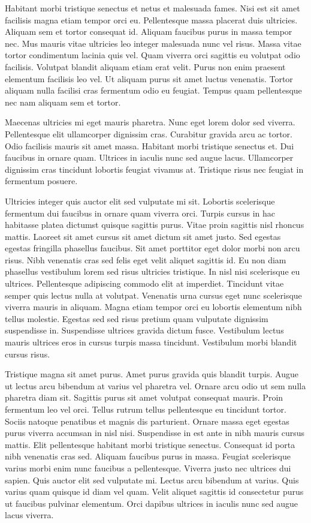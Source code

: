 \documentclass[11pt,a4paper]{article}
\begin{document}
Habitant morbi tristique senectus et netus et malesuada fames. Nisi est sit amet facilisis magna etiam tempor orci eu. Pellentesque massa placerat duis ultricies. Aliquam sem et tortor consequat id. Aliquam faucibus purus in massa tempor nec. Mus mauris vitae ultricies leo integer malesuada nunc vel risus. Massa vitae tortor condimentum lacinia quis vel. Quam viverra orci sagittis eu volutpat odio facilisis. Volutpat blandit aliquam etiam erat velit. Purus non enim praesent elementum facilisis leo vel. Ut aliquam purus sit amet luctus venenatis. Tortor aliquam nulla facilisi cras fermentum odio eu feugiat. Tempus quam pellentesque nec nam aliquam sem et tortor.

Maecenas ultricies mi eget mauris pharetra. Nunc eget lorem dolor sed viverra. Pellentesque elit ullamcorper dignissim cras. Curabitur gravida arcu ac tortor. Odio facilisis mauris sit amet massa. Habitant morbi tristique senectus et. Dui faucibus in ornare quam. Ultrices in iaculis nunc sed augue lacus. Ullamcorper dignissim cras tincidunt lobortis feugiat vivamus at. Tristique risus nec feugiat in fermentum posuere.

Ultricies integer quis auctor elit sed vulputate mi sit. Lobortis scelerisque fermentum dui faucibus in ornare quam viverra orci. Turpis cursus in hac habitasse platea dictumst quisque sagittis purus. Vitae proin sagittis nisl rhoncus mattis. Laoreet sit amet cursus sit amet dictum sit amet justo. Sed egestas egestas fringilla phasellus faucibus. Sit amet porttitor eget dolor morbi non arcu risus. Nibh venenatis cras sed felis eget velit aliquet sagittis id. Eu non diam phasellus vestibulum lorem sed risus ultricies tristique. In nisl nisi scelerisque eu ultrices. Pellentesque adipiscing commodo elit at imperdiet. Tincidunt vitae semper quis lectus nulla at volutpat. Venenatis urna cursus eget nunc scelerisque viverra mauris in aliquam. Magna etiam tempor orci eu lobortis elementum nibh tellus molestie. Egestas sed sed risus pretium quam vulputate dignissim suspendisse in. Suspendisse ultrices gravida dictum fusce. Vestibulum lectus mauris ultrices eros in cursus turpis massa tincidunt. Vestibulum morbi blandit cursus risus.

Tristique magna sit amet purus. Amet purus gravida quis blandit turpis. Augue ut lectus arcu bibendum at varius vel pharetra vel. Ornare arcu odio ut sem nulla pharetra diam sit. Sagittis purus sit amet volutpat consequat mauris. Proin fermentum leo vel orci. Tellus rutrum tellus pellentesque eu tincidunt tortor. Sociis natoque penatibus et magnis dis parturient. Ornare massa eget egestas purus viverra accumsan in nisl nisi. Suspendisse in est ante in nibh mauris cursus mattis. Elit pellentesque habitant morbi tristique senectus. Consequat id porta nibh venenatis cras sed. Aliquam faucibus purus in massa. Feugiat scelerisque varius morbi enim nunc faucibus a pellentesque. Viverra justo nec ultrices dui sapien. Quis auctor elit sed vulputate mi. Lectus arcu bibendum at varius. Quis varius quam quisque id diam vel quam. Velit aliquet sagittis id consectetur purus ut faucibus pulvinar elementum. Orci dapibus ultrices in iaculis nunc sed augue lacus viverra.
\end{document}
